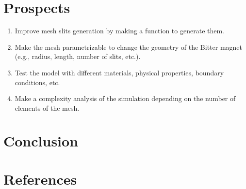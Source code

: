 \documentclass[12pt]{article}
\begin{document}
\section{Prospects}
\begin{enumerate}
  \item Improve mesh slits generation by making a function to generate them.
  \item Make the mesh parametrizable to change the geometry of the Bitter magnet
    (e.g., radius, length, number of slits, etc.).
  \item Test the model with different materials, physical properties, boundary conditions, etc.
  \item Make a complexity analysis of the simulation depending on the number of elements of the mesh.
\end{enumerate}

\section{Conclusion}

\newpage

\section{References}
\printbibliography
\end{document}
